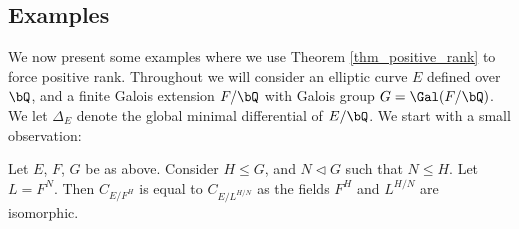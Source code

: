 \subsection{Examples}

We now present some examples where we use Theorem \ref{thm_positive_rank} to force positive rank. Throughout we will consider an elliptic curve $E$ defined over $\bQ$, and a finite Galois extension $F / \bQ$ with Galois group $G = \Gal(F / \bQ)$. We let $\Delta_E$ denote the global minimal differential of $E / \bQ$. 
We start with a small observation:

\begin{rem}
   Let $E$, $F$, $G$ be as above. Consider $H \leq G$, and $N \triangleleft G$ such that $N \leq H$. Let $L = F^N$. Then $C_{E / F^H}$ is equal to $C_{E / L^{H/N}}$ as the fields $F^H$ and $L^{H/ N}$ are isomorphic. 
    
\end{rem}






